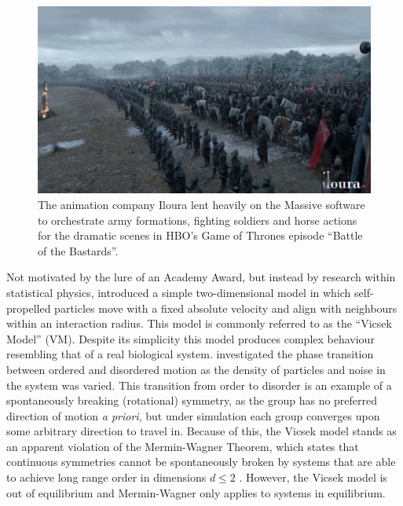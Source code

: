 \begin{figure}[tb]
  \includegraphics[width=\textwidth]{GOT.jpg}
  \caption{The animation company Iloura lent heavily on the Massive software to
    orchestrate army formations, fighting soldiers and horse actions for the
    dramatic scenes in HBO's Game of Thrones episode ``Battle of the
    Bastards''.}
  \label{fig:got}
\end{figure}

Not motivated by the lure of an Academy Award, but instead by research within
statistical physics, \textcite{vicsek95} introduced a simple two-dimensional
model in which self-propelled particles move with a fixed absolute velocity and
align with neighbours within an interaction radius. This model is commonly
referred to as the ``Vicsek Model'' (VM). Despite its simplicity this model
produces complex behaviour resembling that of a real biological system.
\textcite{vicsek95} investigated the phase transition between ordered and
disordered motion as the density of particles and noise in the system was
varied. This transition from order to disorder is an example of a spontaneously
breaking (rotational) symmetry, as the group has no preferred direction of
motion \emph{a priori}, but under simulation each group converges upon some
arbitrary direction to travel in. Because of this, the Vicsek model stands as
an apparent violation of the Mermin-Wagner Theorem, which states that
continuous symmetries cannot be spontaneously broken by systems that are able
to achieve long range order in dimensions $d\leq 2$ \parencite{mermin66}.
However, the Vicsek model is out of equilibrium and Mermin-Wagner only applies
to systems in equilibrium.

